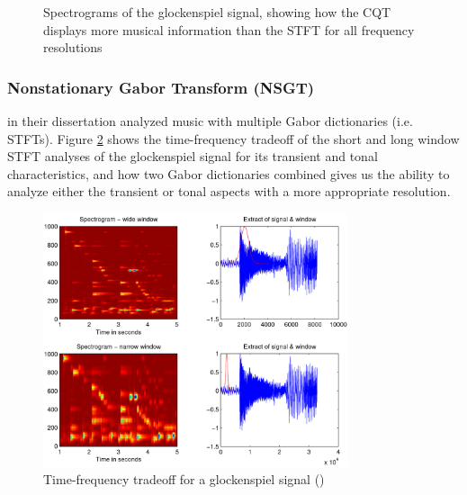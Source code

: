 \documentclass[report.tex]{subfiles}
\begin{document}
\begin{figure}[ht]
	\hspace{0.1em}
	\caption{Spectrograms of the glockenspiel signal, showing how the CQT displays more musical information than the STFT for all frequency resolutions}
	\label{fig:cqtvstft}
\end{figure}

\newpagefill

\subsubsection{Nonstationary Gabor Transform (NSGT)}
\label{sec:theorynsgt}

\textcite{doerflerphd} in their dissertation analyzed music with multiple Gabor dictionaries (i.e. STFTs). Figure \ref{fig:dorflertradeoff} shows the time-frequency tradeoff of the short and long window STFT analyses of the glockenspiel signal for its transient and tonal characteristics, and how two Gabor dictionaries combined gives us the ability to analyze either the transient or tonal aspects with a more appropriate resolution.

\begin{figure}[ht]
	\centering
	\includegraphics[width=0.8\textwidth]{./images-tftheory/tf_tradeoff_dorfler.png}
	\caption{Time-frequency tradeoff for a glockenspiel signal (\cite{doerflerphd})}
	\label{fig:dorflertradeoff}
\end{figure}
\end{document}
